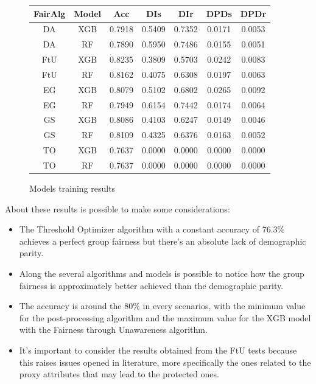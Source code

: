 \begin{figure}[H]
    \centering
    \begin{tabular}{|c|c|c|c|c|c|c|}
        \hline
        \textbf{FairAlg} & \textbf{Model} & \textbf{Acc} & \textbf{DIs} & \textbf{DIr} & \textbf{DPDs} & \textbf{DPDr} \\
        \hline
        DA & XGB & 0.7918 & 0.5409 & 0.7352 & 0.0171 & 0.0053 \\
        DA & RF & 0.7890 & 0.5950 & 0.7486 & 0.0155 & 0.0051 \\
        FtU & XGB & 0.8235 & 0.3809 & 0.5703 & 0.0242 & 0.0083 \\
        FtU & RF & 0.8162 & 0.4075 & 0.6308 & 0.0197 & 0.0063 \\
        EG & XGB & 0.8079 & 0.5102 & 0.6802 & 0.0265 & 0.0092 \\
        EG & RF & 0.7949 & 0.6154 & 0.7442 & 0.0174 & 0.0064 \\
        GS & XGB & 0.8086 & 0.4103 & 0.6247 & 0.0149 & 0.0046 \\
        GS & RF & 0.8109 & 0.4325 & 0.6376 & 0.0163 & 0.0052 \\
        TO & XGB & 0.7637 & 0.0000 & 0.0000 & 0.0000 & 0.0000 \\
        TO & RF & 0.7637 & 0.0000 & 0.0000 & 0.0000 & 0.0000 \\
        \hline
    \end{tabular}
    \caption{Models training results}
    \label{fig:results}
\end{figure}

About these results is possible to make some considerations:
\begin{itemize}
    \item The Threshold Optimizer algorithm with a constant accuracy of 76.3\% achieves a perfect group fairness but there's an absolute lack of demographic parity.
    \item Along the several algorithms and models is possible to notice how the group fairness is approximately better achieved than the demographic parity.
    \item The accuracy is around the 80\% in every scenarios, with the minimum value for the post-processing algorithm and the maximum value for the XGB model with the Fairness through Unawareness algorithm.
    \item It's important to consider the results obtained from the FtU tests because this raises issues opened in literature, more specifically the ones related to the proxy attributes that may lead to the protected ones.
\end{itemize}


